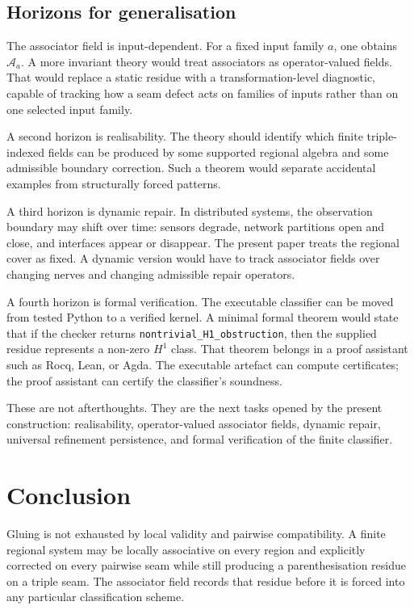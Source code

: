 \documentclass[11pt]{article}
\begin{document}
\subsection{Horizons for generalisation}

The associator field is input-dependent. For a fixed input family \(a\), one obtains \(\mathcal A_a\). A more invariant theory would treat associators as operator-valued fields. That would replace a static residue with a transformation-level diagnostic, capable of tracking how a seam defect acts on families of inputs rather than on one selected input family.

A second horizon is realisability. The theory should identify which finite triple-indexed fields can be produced by some supported regional algebra and some admissible boundary correction. Such a theorem would separate accidental examples from structurally forced patterns.

A third horizon is dynamic repair. In distributed systems, the observation boundary may shift over time: sensors degrade, network partitions open and close, and interfaces appear or disappear. The present paper treats the regional cover as fixed. A dynamic version would have to track associator fields over changing nerves and changing admissible repair operators.

A fourth horizon is formal verification. The executable classifier can be moved from tested Python to a verified kernel. A minimal formal theorem would state that if the checker returns \texttt{nontrivial\_H1\_obstruction}, then the supplied residue represents a non-zero \(H^1\) class. That theorem belongs in a proof assistant such as Rocq, Lean, or Agda. The executable artefact can compute certificates; the proof assistant can certify the classifier's soundness.

These are not afterthoughts. They are the next tasks opened by the present construction: realisability, operator-valued associator fields, dynamic repair, universal refinement persistence, and formal verification of the finite classifier.

\section{Conclusion}

Gluing is not exhausted by local validity and pairwise compatibility. A finite regional system may be locally associative on every region and explicitly corrected on every pairwise seam while still producing a parenthesisation residue on a triple seam. The associator field records that residue before it is forced into any particular classification scheme.
\end{document}
